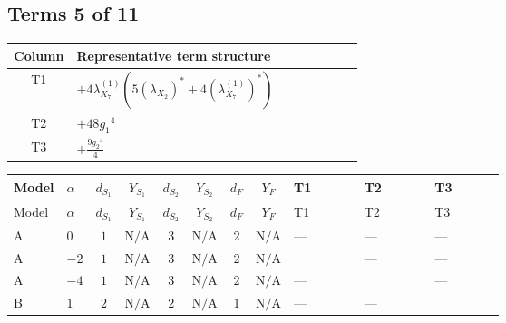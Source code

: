 \documentclass[8pt]{article}
\begin{document}
\begin{landscape}
\subsection*{Terms 5 of 11}
\begin{center}
\begin{tabular}{@{}c >{\raggedright\arraybackslash}p{0.82\linewidth}@{}}
\toprule
Column & Representative term structure \\
\midrule
T1 & \(\displaystyle +4 {\lambda_{X_{7}}^{(1)}} (5 \left({\lambda_{X_{2}}}\right)^{*}+4 \left({\lambda_{X_{7}}^{(1)}}\right)^{*})\) \\
\midrule
T2 & \(\displaystyle +48 {g_1}^4\) \\
\midrule
T3 & \(\displaystyle +\frac{9 {g_2}^4}{4}\) \\
\midrule
\bottomrule
\end{tabular}
\end{center}
\smallskip
\tiny
\begin{longtable}{@{}llcccccc >{\raggedright\arraybackslash}p{0.21\linewidth} >{\raggedright\arraybackslash}p{0.21\linewidth} >{\raggedright\arraybackslash}p{0.21\linewidth}@{}}
\toprule
Model & $\alpha$ & $d_{S_1}$ & $Y_{S_1}$ & $d_{S_2}$ & $Y_{S_2}$ & $d_F$ & $Y_F$ & T1 & T2 & T3 \\
\midrule
\endfirsthead
\toprule
Model & $\alpha$ & $d_{S_1}$ & $Y_{S_1}$ & $d_{S_2}$ & $Y_{S_2}$ & $d_F$ & $Y_F$ & T1 & T2 & T3 \\
\midrule
\endhead
A & $0$ & $1$ & $\text{N/A}$ & $3$ & $\text{N/A}$ & $2$ & $\text{N/A}$ & --- & --- & --- \\
\midrule
A & $-2$ & $1$ & $\text{N/A}$ & $3$ & $\text{N/A}$ & $2$ & $\text{N/A}$ & \scriptsize\adjustbox{max width=\linewidth}{$\begin{gathered} +4 {\lambda_{X_{7}}^{(1)}} (5 \left({\lambda_{X_{2}}}\right)^{*}+4 \left({\lambda_{X_{7}}^{(1)}}\right)^{*})\end{gathered}$} & --- & --- \\
\midrule
A & $-4$ & $1$ & $\text{N/A}$ & $3$ & $\text{N/A}$ & $2$ & $\text{N/A}$ & --- & \scriptsize\adjustbox{max width=\linewidth}{$\begin{gathered} +48 {g_1}^4\end{gathered}$} & --- \\
\midrule
B & $1$ & $2$ & $\text{N/A}$ & $2$ & $\text{N/A}$ & $1$ & $\text{N/A}$ & --- & --- & \scriptsize\adjustbox{max width=\linewidth}{$\begin{gathered} +\frac{9 {g_2}^4}{4}\end{gathered}$} \\

\end{longtable}
\end{landscape}
\end{document}
